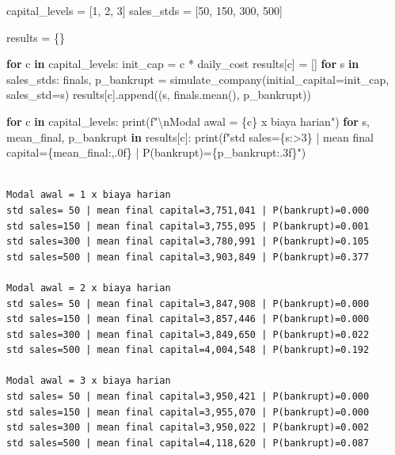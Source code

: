\documentclass[
  letterpaper,
  DIV=11,
  numbers=noendperiod]{scrreprt}
\newenvironment{Shaded}{\begin{snugshade}}{\end{snugshade}}
\newcommand{\BuiltInTok}[1]{\textcolor[rgb]{0.00,0.23,0.31}{#1}}
\newcommand{\CharTok}[1]{\textcolor[rgb]{0.13,0.47,0.30}{#1}}
\newcommand{\ControlFlowTok}[1]{\textcolor[rgb]{0.00,0.23,0.31}{\textbf{#1}}}
\newcommand{\DecValTok}[1]{\textcolor[rgb]{0.68,0.00,0.00}{#1}}
\newcommand{\KeywordTok}[1]{\textcolor[rgb]{0.00,0.23,0.31}{\textbf{#1}}}
\newcommand{\NormalTok}[1]{\textcolor[rgb]{0.00,0.23,0.31}{#1}}
\newcommand{\OperatorTok}[1]{\textcolor[rgb]{0.37,0.37,0.37}{#1}}
\newcommand{\SpecialCharTok}[1]{\textcolor[rgb]{0.37,0.37,0.37}{#1}}
\newcommand{\SpecialStringTok}[1]{\textcolor[rgb]{0.13,0.47,0.30}{#1}}
\begin{document}
\begin{Shaded}
\begin{Highlighting}[]
\NormalTok{capital\_levels }\OperatorTok{=}\NormalTok{ [}\DecValTok{1}\NormalTok{, }\DecValTok{2}\NormalTok{, }\DecValTok{3}\NormalTok{]}
\NormalTok{sales\_stds }\OperatorTok{=}\NormalTok{ [}\DecValTok{50}\NormalTok{, }\DecValTok{150}\NormalTok{, }\DecValTok{300}\NormalTok{, }\DecValTok{500}\NormalTok{]}

\NormalTok{results }\OperatorTok{=}\NormalTok{ \{\}}

\ControlFlowTok{for}\NormalTok{ c }\KeywordTok{in}\NormalTok{ capital\_levels:}
\NormalTok{    init\_cap }\OperatorTok{=}\NormalTok{ c }\OperatorTok{*}\NormalTok{ daily\_cost}
\NormalTok{    results[c] }\OperatorTok{=}\NormalTok{ []}
    \ControlFlowTok{for}\NormalTok{ s }\KeywordTok{in}\NormalTok{ sales\_stds:}
\NormalTok{        finals, p\_bankrupt }\OperatorTok{=}\NormalTok{ simulate\_company(initial\_capital}\OperatorTok{=}\NormalTok{init\_cap, sales\_std}\OperatorTok{=}\NormalTok{s)}
\NormalTok{        results[c].append((s, finals.mean(), p\_bankrupt))}

\ControlFlowTok{for}\NormalTok{ c }\KeywordTok{in}\NormalTok{ capital\_levels:}
    \BuiltInTok{print}\NormalTok{(}\SpecialStringTok{f"}\CharTok{\textbackslash{}n}\SpecialStringTok{Modal awal = }\SpecialCharTok{\{}\NormalTok{c}\SpecialCharTok{\}}\SpecialStringTok{ x biaya harian"}\NormalTok{)}
    \ControlFlowTok{for}\NormalTok{ s, mean\_final, p\_bankrupt }\KeywordTok{in}\NormalTok{ results[c]:}
        \BuiltInTok{print}\NormalTok{(}\SpecialStringTok{f"std sales=}\SpecialCharTok{\{}\NormalTok{s}\SpecialCharTok{:\textgreater{}3\}}\SpecialStringTok{ | mean final capital=}\SpecialCharTok{\{}\NormalTok{mean\_final}\SpecialCharTok{:,.0f\}}\SpecialStringTok{ | P(bankrupt)=}\SpecialCharTok{\{}\NormalTok{p\_bankrupt}\SpecialCharTok{:.3f\}}\SpecialStringTok{"}\NormalTok{)}
\end{Highlighting}
\end{Shaded}

\begin{verbatim}

Modal awal = 1 x biaya harian
std sales= 50 | mean final capital=3,751,041 | P(bankrupt)=0.000
std sales=150 | mean final capital=3,755,095 | P(bankrupt)=0.001
std sales=300 | mean final capital=3,780,991 | P(bankrupt)=0.105
std sales=500 | mean final capital=3,903,849 | P(bankrupt)=0.377

Modal awal = 2 x biaya harian
std sales= 50 | mean final capital=3,847,908 | P(bankrupt)=0.000
std sales=150 | mean final capital=3,857,446 | P(bankrupt)=0.000
std sales=300 | mean final capital=3,849,650 | P(bankrupt)=0.022
std sales=500 | mean final capital=4,004,548 | P(bankrupt)=0.192

Modal awal = 3 x biaya harian
std sales= 50 | mean final capital=3,950,421 | P(bankrupt)=0.000
std sales=150 | mean final capital=3,955,070 | P(bankrupt)=0.000
std sales=300 | mean final capital=3,950,022 | P(bankrupt)=0.002
std sales=500 | mean final capital=4,118,620 | P(bankrupt)=0.087
\end{verbatim}
\end{document}
